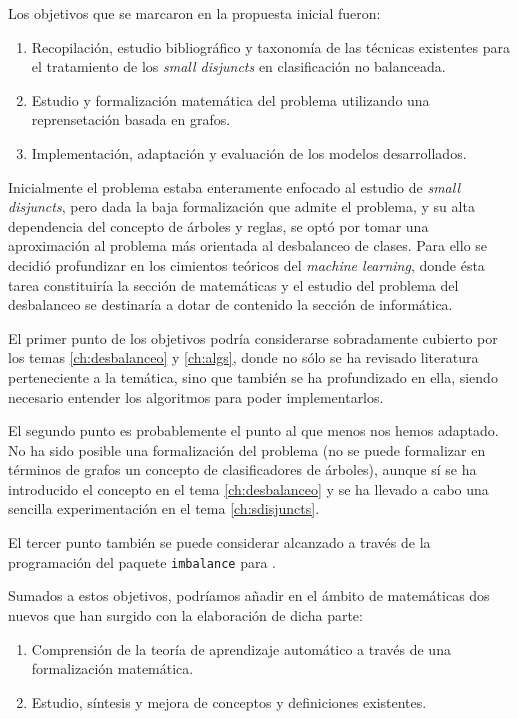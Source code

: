 Los objetivos que se marcaron en la propuesta inicial fueron:
\begin{enumerate}[i]
 \item Recopilación, estudio bibliográfico y taxonomía de las técnicas existentes para el tratamiento de los 
 \textit{small disjuncts} en clasificación no balanceada.
 \item Estudio y formalización matemática del problema utilizando una reprensetación basada en grafos.
 \item Implementación, adaptación y evaluación de los modelos desarrollados.
\end{enumerate}

Inicialmente el problema estaba enteramente enfocado al estudio de \textit{small disjuncts}, pero dada la baja formalización
que admite el problema, y su alta dependencia del concepto de árboles y reglas, se optó por tomar una aproximación 
al problema más orientada al desbalanceo de clases. Para ello se decidió profundizar en los cimientos
teóricos del \textit{machine learning}, donde ésta tarea constituiría la sección de matemáticas y el estudio del problema
del desbalanceo se destinaría a dotar de contenido la sección de informática.

El primer punto de los objetivos podría considerarse sobradamente cubierto por los temas \ref{ch:desbalanceo} y 
\ref{ch:algs}, donde no sólo se ha revisado literatura perteneciente a la temática, sino que también se ha profundizado en
ella, siendo necesario entender los algoritmos para poder implementarlos.

El segundo punto es probablemente el punto al que menos nos hemos adaptado. No ha sido posible una formalización del problema
(no se puede formalizar en términos de grafos un concepto de clasificadores de árboles), aunque sí se ha introducido el
concepto en el tema \ref{ch:desbalanceo} y se ha llevado a cabo una sencilla experimentación en el tema \ref{ch:sdisjuncts}.

El tercer punto también se puede considerar alcanzado a través de la programación del paquete \texttt{imbalance} para \R.

Sumados a estos objetivos, podríamos añadir en el ámbito de matemáticas dos nuevos que han surgido con la elaboración de
dicha parte:
\begin{enumerate}[i]
 \item Comprensión de la teoría de aprendizaje automático a través de una formalización matemática.
 \item Estudio, síntesis y mejora de conceptos y definiciones existentes.
\end{enumerate}

